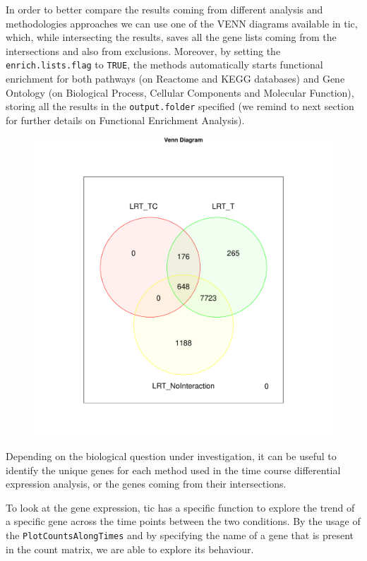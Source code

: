In order to better compare the results coming from different analysis and methodologies approaches we can use one of the VENN diagrams available in \gls{tic}, which, while intersecting the results, saves all the gene lists coming from the intersections and also from exclusions.
Moreover, by setting the \lstinline!enrich.lists.flag! to \lstinline!TRUE!, the methods automatically starts functional enrichment for both pathways (on Reactome and KEGG databases) and Gene Ontology (on Biological Process, Cellular Components and Molecular Function), storing all the results in the \lstinline!output.folder! specified (we remind to next section for further details on Functional Enrichment Analysis).

\begin{figure}[H]
\includegraphics[width=\textwidth,height=\textheight,keepaspectratio]{img/ticorser/de/venn3.pdf}
\caption[ticorser venn diagram]{}
\label{fig:ticorservenn}
\centering
\end{figure}

Depending on the biological question under investigation, it can be useful to identify the unique genes for each method used in the time course differential expression analysis, or the genes coming from their intersections.

To look at the gene expression, \gls{tic} has a specific function to explore the trend of a specific gene across the time points between the two conditions. 
By the usage of the \lstinline!PlotCountsAlongTimes! and by specifying the name of a gene that is present in the count matrix, we are able to explore its behaviour.

